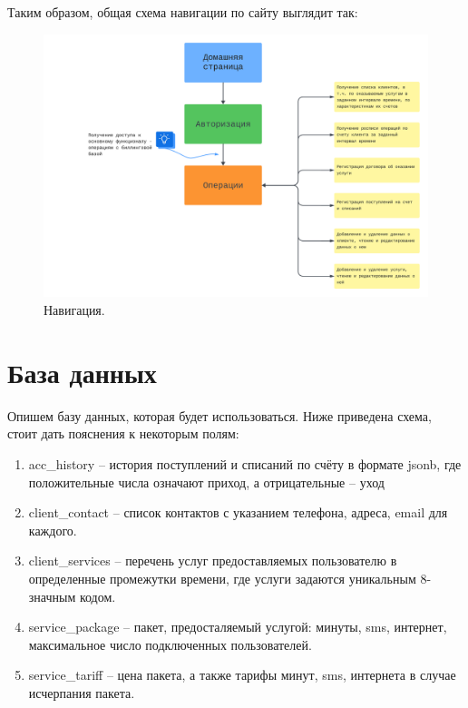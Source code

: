 \documentclass[oneside,senior,etd]{BYUPhysForDegree}
\begin{document}
Таким образом, общая схема навигации по сайту выглядит так:

\begin{figure}[hbt!]
    \centering
    \includegraphics[width=1.0\linewidth]{sitemap.png}
    \caption{Навигация.}
    \label{fig:sitemap}
\end{figure}

\newpage
\section{База данных}

Опишем базу данных, которая будет использоваться. Ниже приведена схема, стоит дать пояснения к некоторым полям:
\begin{enumerate}
    \item acc\_history -- история поступлений и списаний по счёту в формате jsonb, где положительные числа означают приход, а отрицательные -- уход
    \item client\_contact -- список контактов с указанием телефона, адреса, email для каждого.
    \item client\_services -- перечень услуг предоставляемых пользователю в определенные промежутки времени, где услуги задаются уникальным 8-значным кодом.
    \item service\_package -- пакет, предосталяемый услугой: минуты, sms, интернет, максимальное число подключенных пользователей.
    \item service\_tariff -- цена пакета, а также тарифы минут, sms, интернета в случае исчерпания пакета.
\end{enumerate}
\end{document}
